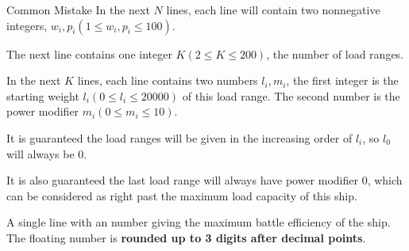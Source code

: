 \begin{problem}{Common Mistake}
In the next $N$ lines, each line will contain two nonnegative integers,
$w_i, p_i (1 \le w_i, p_i \le 100)$.

The next line contains one integer $K(2\le K \le 200)$, 
the number of load ranges.

In the next $K$ lines, each line contains two numbers $l_i, m_i$, the 
first integer is the starting weight $l_i (0 \le l_i \le 20000)$ of this load 
range.
The second number is the power modifier $m_i (0 \le m_i \le 10)$.

It is guaranteed the load ranges will be given in the increasing order 
of $l_i$, so $l_0$ will always be 0.

It is also guaranteed the last load range will always have power modifier $0$, 
which can be considered as right past the maximum load capacity of this ship.

\OutputFile

A single line with an number giving the maximum battle efficiency of the ship.
The floating number is \textbf{rounded up to 3 digits after decimal points}. 

\Examples

\begin{example}
%
%
\end{example}
\end{problem}
